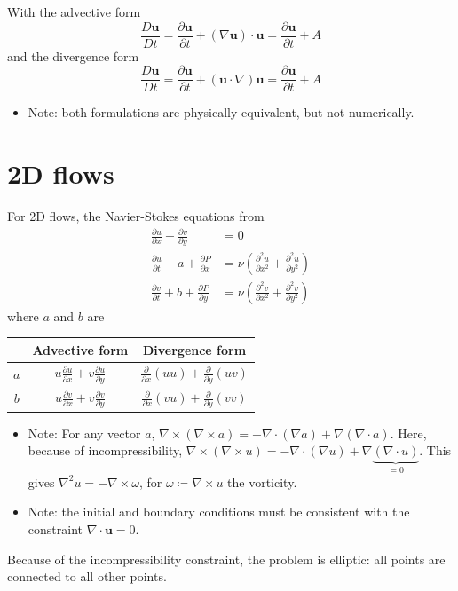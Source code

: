 \documentclass[12pt, openany]{report}
\theoremstyle{definition}
\begin{document}
With the advective form 
\begin{equation}
	\frac{D\boldsymbol{u}}{Dt} = \frac{\partial \boldsymbol{u}}{\partial t} + (\nabla \boldsymbol{u})\cdot \boldsymbol{u} = \frac{\partial \boldsymbol{u}}{\partial t} + A
\end{equation}
and the divergence form 
\begin{equation}
	\frac{D\boldsymbol{u}}{Dt} = \frac{\partial \boldsymbol{u}}{\partial t} + (\boldsymbol{u}\cdot \nabla)\boldsymbol{u} = \frac{\partial \boldsymbol{u}}{\partial t} + A 
\end{equation}
\begin{itemize}
	\item [$\to$] Note: both formulations are physically equivalent, but not numerically. 
\end{itemize}
\section{2D flows}
For 2D flows, the Navier-Stokes equations from 
\begin{equation}
	\begin{aligned}
		\frac{\partial u}{\partial x} + \frac{\partial v}{\partial y} &= 0 \\
		\frac{\partial u}{\partial t} + a + \frac{\partial P}{\partial x} &= \nu \left(\frac{\partial^2 u}{\partial x^2} + \frac{\partial^2 u}{\partial y^2}\right)\\
		\frac{\partial v}{\partial t} + b + \frac{\partial P}{\partial y} &= \nu \left(\frac{\partial^2v}{\partial x^2} + \frac{\partial^2 v}{\partial y^2}\right)
	\end{aligned}
\end{equation}
where $a$ and $b$ are 
\begin{center}
	\begin{tabular}{c|c|c}
		& Advective form & Divergence form\\\hline 
		$a$ & $u\frac{\partial u}{\partial x} + v \frac{\partial u}{\partial y}$ & $\frac{\partial}{\partial x}(uu) + \frac{\partial}{\partial y}(uv)$\\
		$b$ & $u\frac{\partial v}{\partial x} + v\frac{\partial v}{\partial y}$ & $\frac{\partial}{\partial x}(vu) + \frac{\partial }{\partial y}(vv)$
	\end{tabular}
\end{center}
\begin{itemize}
	\item [$\to$] Note: For any vector $a$, $\nabla \times (\nabla \times a)=-\nabla \cdot(\nabla a) + \nabla (\nabla \cdot a)$. Here, because of incompressibility, $\nabla\times(\nabla\times u) = -\nabla \cdot(\nabla u) + \nabla \underbrace{(\nabla \cdot u)}_{=0}$. This gives $\nabla^2 u = -\nabla \times \omega$, for $\omega\coloneqq \nabla \times u$ the vorticity. 
	\item [$\to$] Note: the initial and boundary conditions must be consistent with the constraint $\nabla \cdot \boldsymbol{u}=0$.
\end{itemize}
Because of the incompressibility constraint, the problem is elliptic: all points are connected to all other points. 
\end{document}
